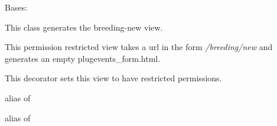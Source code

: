 \documentclass[letterpaper,10pt,english]{sphinxmanual}
\begin{document}
\begin{fulllineitems}
\label{api:mousedb.animal.views.BreedingCreate}
Bases: \href{http://docs.djangoproject.com/en/dev/ref/class-based-views/\#django.views.generic.edit.CreateView}{}

This class generates the breeding-new view.

This permission restricted view takes a url in the form \emph{/breeding/new} and generates an empty plugevents\_form.html.

\begin{fulllineitems}
\label{api:mousedb.animal.views.BreedingCreate.dispatch}
This decorator sets this view to have restricted permissions.

\end{fulllineitems}


\begin{fulllineitems}
\label{api:mousedb.animal.views.BreedingCreate.form_class}
alias of 

\end{fulllineitems}


\begin{fulllineitems}
\label{api:mousedb.animal.views.BreedingCreate.model}
alias of 

\end{fulllineitems}


\begin{fulllineitems}
\label{api:mousedb.animal.views.BreedingCreate.template_name}
\end{fulllineitems}


\end{fulllineitems}

\end{document}

